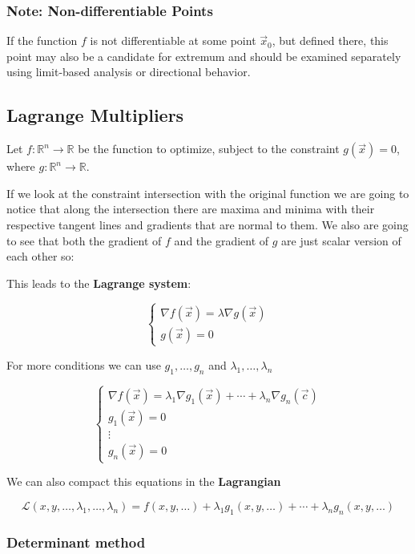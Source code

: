 \subsubsection{Note: Non-differentiable Points}

If the function \( f \) is not differentiable at some point \( \vec{x}_0 \), but defined there, this point may also be a candidate for extremum and should be examined separately using limit-based analysis or directional behavior.

\subsection{Lagrange Multipliers}

Let \( f : \mathbb{R}^n \to \mathbb{R} \) be the function to optimize, subject to the constraint \( g(\vec{x}) = 0 \), where \( g : \mathbb{R}^n \to \mathbb{R} \).  

If we look at the constraint intersection with the original function we are going to notice that along the intersection
there are maxima and minima with their respective tangent lines
and gradients that are normal to them. We also are going to see that both the gradient of \(f\) and 
the gradient of \(g\) are just scalar version of each other so: 

This leads to the \textbf{Lagrange system}:

\[
\begin{cases}
\nabla f(\vec{x}) = \lambda \nabla g(\vec{x}) \\
g(\vec{x}) = 0
\end{cases}
\]

For more conditions  we can use \(g_1, \dots, g_n\) and \(\lambda_1, \dots, \lambda_n\)

\[
\begin{cases}
\nabla f(\vec{x}) = \lambda_1 \nabla g_1(\vec{x}) + \cdots + \lambda_n \nabla g_n(\vec{c}) \\
g_1(\vec{x}) = 0 \\
\vdots \\
g_n(\vec{x}) = 0
\end{cases}
\]


We can also compact this equations in the \textbf{Lagrangian}

\[
\mathcal{L}(x,y, \dots, \lambda_1, \dots, \lambda_n) = f(x, y, \dots) + \lambda_1 g_1(x, y, \dots) + \cdots + \lambda_n g_n(x, y, \dots)
\]

\subsubsection{Determinant method}

